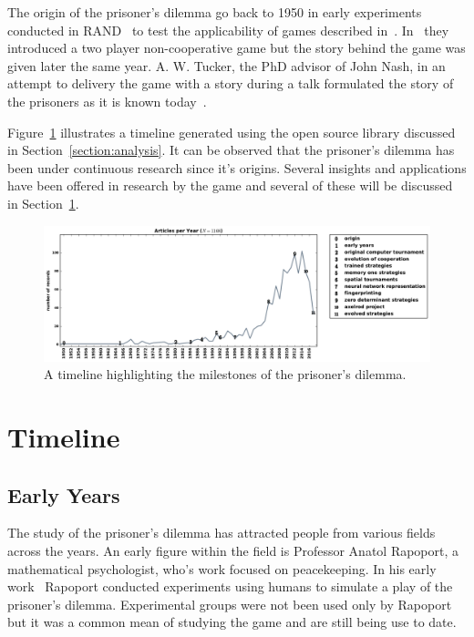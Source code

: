 \documentclass{article}
\begin{document}
The origin of the prisoner's dilemma go back to 1950 in early experiments
conducted in RAND~\cite{Flood1958} to test the applicability of games
described in~\cite{VonNeumann1944}. In~\cite{Flood1958} they introduced
a two player non-cooperative game but the story behind the game was
given later the same year. A. W. Tucker, the PhD advisor of John Nash, in
an attempt to delivery the game with a story during a talk formulated the story
of the prisoners as it is known today~\cite{Tucker1983}.

Figure~\ref{fig:timeline} illustrates a timeline generated using the open source 
library discussed in Section~\ref{section:analysis}. It can be observed that 
the prisoner's dilemma has been under continuous research since it's origins.
Several insights and applications have been offered in research by the game and
several of these will be discussed in Section~\ref{section:timeline}.

\begin{figure}[!htbp]
    \centering
    \includegraphics[width=\textwidth]{assets/images/timeline.pdf}
    \caption{\label{fig:timeline} A timeline highlighting the milestones of the 
    prisoner's dilemma.}
\end{figure}

\section{Timeline}\label{section:timeline}

\subsection{Early Years}
The study of the prisoner's dilemma has attracted people from various fields
across the years. An early figure within the field is Professor Anatol Rapoport,
a mathematical psychologist, who's work focused on peacekeeping.
In his early work~\cite{rapoport1965} Rapoport conducted experiments using humans
to simulate a play of the prisoner's dilemma. Experimental groups were not been
used only by Rapoport but it was a common mean of studying the game
\cite{Evans1966, Gallo1968, Lutzker1961, Mack1971, Sensenig1972} and are still
being use to date. %
\end{document}
